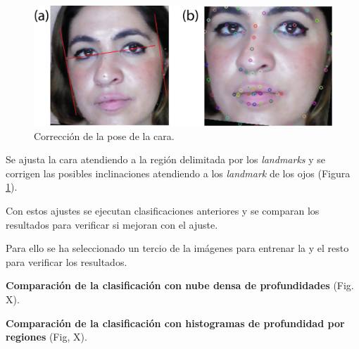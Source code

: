 \begin{figure}
\centering
\includegraphics[width=1\textwidth]{ch-sistemasABC/images/ch-evaluacion_topologias/CORRECION_DE_POSE.png}
    \caption{Corrección de la pose de la cara.}
    \label{fig:CORRECCION_DE_LA_POSE}
\end{figure}

Se ajusta la cara atendiendo a la región delimitada por los \textit{landmarks} y se corrigen las posibles inclinaciones atendiendo a los \textit{landmark} de los ojos (Figura \ref{fig:CORRECCION_DE_LA_POSE}).

Con estos ajustes se ejecutan clasificaciones anteriores y se comparan los resultados para verificar si mejoran con el ajuste.

Para ello se ha seleccionado un tercio de la imágenes para entrenar la  y el resto para verificar los resultados. 

\textbf{Comparación de la clasificación con nube densa de profundidades} (Fig. X).


\textbf{Comparación de la clasificación con histogramas de profundidad por regiones}  (Fig, X). 

